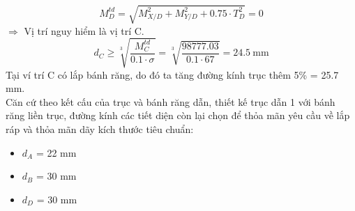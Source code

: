 \begin{equation}
    M_D^{td} 
    = \sqrt{M_{X/D}^2 + M_{Y/D}^2 + 0.75 \cdot T_D^2} 
    = 0 
\end{equation}
$\Rightarrow$ Vị trí nguy hiểm là vị trí C.
\begin{equation}
    d_C \ge \sqrt[3]{\frac{M_C^{td}}{0.1 \cdot \sigma}} 
        = \sqrt[3]{\frac{98777.03}{0.1 \cdot 67}} 
        = 24.5\ \text{mm}
\end{equation}
Tại ví trí C có lắp bánh răng, do đó ta tăng đường kính trục thêm 5\% = 25.7 mm. \\
Căn cứ theo kết cấu của trục và bánh răng dẫn, thiết kế trục dẫn 1 với bánh răng liền trục, đường kính các tiết diện còn lại chọn để thỏa mãn yêu cầu về lắp ráp và thỏa mãn dãy kích thước tiêu chuẩn: 
\begin{itemize}
    \item $d_A$ = 22 mm
    \item $d_B$ = 30 mm
    \item $d_D$ = 30 mm
\end{itemize}

